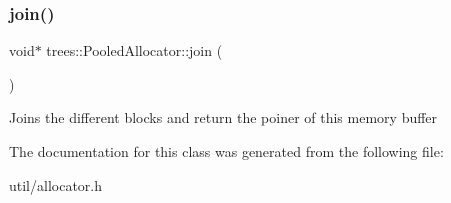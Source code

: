 \mbox{\label{classtrees_1_1_pooled_allocator_a48598296a62c31931cbcd1d8fb61f43f}} 
\subsubsection{\texorpdfstring{join()}{join()}}
{\footnotesize\ttfamily void$\ast$ trees\+::\+Pooled\+Allocator\+::join (\begin{DoxyParamCaption}{ }\end{DoxyParamCaption})\hspace{0.3cm}{\ttfamily [inline]}}

Joins the different blocks and return the poiner of this memory buffer 

The documentation for this class was generated from the following file\+:\begin{DoxyCompactItemize}
\item 
util/allocator.\+h\end{DoxyCompactItemize}
